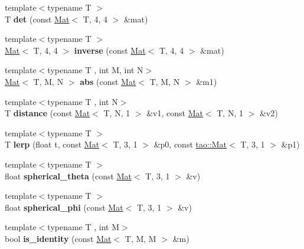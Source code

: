 \begin{DoxyCompactItemize}
{\footnotesize template$<$typename T $>$ }\\T {\bfseries det} (const \mbox{\hyperlink{classtao_1_1_mat}{Mat}}$<$ T, 4, 4 $>$ \&mat)
\item 
\mbox{\label{namespacetao_a0a17e14d5d1b8f7a8b41e198b2b961d3}} 
{\footnotesize template$<$typename T $>$ }\\\mbox{\hyperlink{classtao_1_1_mat}{Mat}}$<$ T, 4, 4 $>$ {\bfseries inverse} (const \mbox{\hyperlink{classtao_1_1_mat}{Mat}}$<$ T, 4, 4 $>$ \&mat)
\item 
\mbox{\label{namespacetao_ab4a3ef7a2c09d666117ca335f94f60cb}} 
{\footnotesize template$<$typename T , int M, int N$>$ }\\\mbox{\hyperlink{classtao_1_1_mat}{Mat}}$<$ T, M, N $>$ {\bfseries abs} (const \mbox{\hyperlink{classtao_1_1_mat}{Mat}}$<$ T, M, N $>$ \&m1)
\item 
\mbox{\label{namespacetao_a0ad55693b5e325746cef811d68233127}} 
{\footnotesize template$<$typename T , int N$>$ }\\T {\bfseries distance} (const \mbox{\hyperlink{classtao_1_1_mat}{Mat}}$<$ T, N, 1 $>$ \&v1, const \mbox{\hyperlink{classtao_1_1_mat}{Mat}}$<$ T, N, 1 $>$ \&v2)
\item 
\mbox{\label{namespacetao_ad4eedb2744fdd348fd6ecf77c9c0761b}} 
{\footnotesize template$<$typename T $>$ }\\T {\bfseries lerp} (float t, const \mbox{\hyperlink{classtao_1_1_mat}{Mat}}$<$ T, 3, 1 $>$ \&p0, const \mbox{\hyperlink{classtao_1_1_mat}{tao\+::\+Mat}}$<$ T, 3, 1 $>$ \&p1)
\item 
\mbox{\label{namespacetao_ae3f87c76e9bcd4ae8fd729faa7dcf690}} 
{\footnotesize template$<$typename T $>$ }\\float {\bfseries spherical\+\_\+theta} (const \mbox{\hyperlink{classtao_1_1_mat}{Mat}}$<$ T, 3, 1 $>$ \&v)
\item 
\mbox{\label{namespacetao_af2ab01c4395f0f0627dda092fde39dde}} 
{\footnotesize template$<$typename T $>$ }\\float {\bfseries spherical\+\_\+phi} (const \mbox{\hyperlink{classtao_1_1_mat}{Mat}}$<$ T, 3, 1 $>$ \&v)
\item 
\mbox{\label{namespacetao_a044f2a314cd201423474fb42d2f64ecf}} 
{\footnotesize template$<$typename T , int M$>$ }\\bool {\bfseries is\+\_\+identity} (const \mbox{\hyperlink{classtao_1_1_mat}{Mat}}$<$ T, M, M $>$ \&m)
\end{DoxyCompactItemize}


